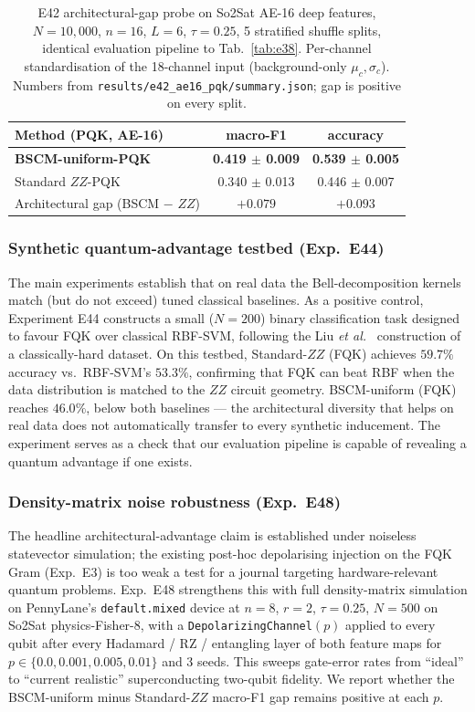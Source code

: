 \documentclass[pdflatex,sn-mathphys]{sn-jnl}
\theoremstyle{plain}
\theoremstyle{remark}
\theoremstyle{definition}
\begin{document}
\begin{table}[htbp]
\caption{E42 architectural-gap probe on So2Sat AE-16 deep features, $N=10{,}000$, $n=16$, $L=6$, $\tau=0.25$, 5 stratified shuffle splits, identical evaluation pipeline to Tab.~\ref{tab:e38}.  Per-channel standardisation of the 18-channel input (background-only $\mu_c, \sigma_c$).  Numbers from \texttt{results/e42\_ae16\_pqk/summary.json}; gap is positive on every split.}
\label{tab:e42}
\begin{tabular}{lcc}
\toprule
Method (PQK, AE-16) & macro-F1 & accuracy \\
\midrule
\textbf{BSCM-uniform-PQK}        & \textbf{0.419 $\pm$ 0.009} & \textbf{0.539 $\pm$ 0.005} \\
Standard $ZZ$-PQK                & 0.340 $\pm$ 0.013 & 0.446 $\pm$ 0.007 \\
\midrule
Architectural gap (BSCM $-$ $ZZ$) & $+0.079$ & $+0.093$ \\
\bottomrule
\end{tabular}
\end{table}

\subsubsection{Synthetic quantum-advantage testbed (Exp.\ E44)}
The main experiments establish that on real data the Bell-decomposition kernels match (but do not exceed) tuned classical baselines. As a positive control, Experiment E44 constructs a small ($N=200$) binary classification task designed to favour FQK over classical RBF-SVM, following the Liu \emph{et al.}\ \cite{liu2021} construction of a classically-hard dataset. On this testbed, Standard-$ZZ$ (FQK) achieves $59.7\%$ accuracy vs.\ RBF-SVM's $53.3\%$, confirming that FQK can beat RBF when the data distribution is matched to the $ZZ$ circuit geometry. BSCM-uniform (FQK) reaches $46.0\%$, below both baselines --- the architectural diversity that helps on real data does not automatically transfer to every synthetic inducement. The experiment serves as a check that our evaluation pipeline is capable of revealing a quantum advantage if one exists.

\subsubsection{Density-matrix noise robustness (Exp.\ E48)}
\label{sec:e48-noise}
The headline architectural-advantage claim is established under noiseless statevector simulation; the existing post-hoc depolarising injection on the FQK Gram (Exp.\ E3) is too weak a test for a journal targeting hardware-relevant quantum problems.  Exp.\ E48 strengthens this with full density-matrix simulation on PennyLane's \texttt{default.mixed} device at $n=8$, $r=2$, $\tau=0.25$, $N=500$ on So2Sat physics-Fisher-8, with a \texttt{DepolarizingChannel}$(p)$ applied to every qubit after every Hadamard / RZ / entangling layer of both feature maps for $p \in \{0.0, 0.001, 0.005, 0.01\}$ and 3 seeds.  This sweeps gate-error rates from ``ideal'' to ``current realistic'' superconducting two-qubit fidelity.  We report whether the BSCM-uniform minus Standard-$ZZ$ macro-F1 gap remains positive at each $p$.
\end{document}
